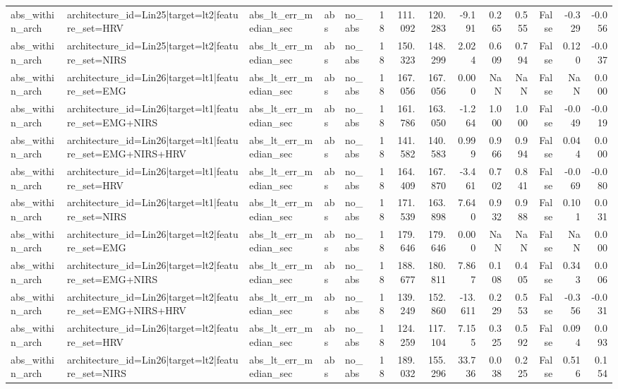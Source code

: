 \begin{table}
\begin{tabular}{lllllrrrrrrrrr}
abs_within_arch & architecture_id=Lin25|target=lt2|feature_set=HRV & abs_lt_err_median_sec & abs & no_abs & 18 & 111.092 & 120.283 & -9.191 & 0.265 & 0.555 & False & -0.329 & -0.056 \\
abs_within_arch & architecture_id=Lin25|target=lt2|feature_set=NIRS & abs_lt_err_median_sec & abs & no_abs & 18 & 150.323 & 148.299 & 2.024 & 0.609 & 0.794 & False & 0.120 & -0.037 \\
abs_within_arch & architecture_id=Lin26|target=lt1|feature_set=EMG & abs_lt_err_median_sec & abs & no_abs & 18 & 167.056 & 167.056 & 0.000 & NaN & NaN & False & NaN & 0.000 \\
abs_within_arch & architecture_id=Lin26|target=lt1|feature_set=EMG+NIRS & abs_lt_err_median_sec & abs & no_abs & 18 & 161.786 & 163.050 & -1.264 & 1.000 & 1.000 & False & -0.049 & -0.019 \\
abs_within_arch & architecture_id=Lin26|target=lt1|feature_set=EMG+NIRS+HRV & abs_lt_err_median_sec & abs & no_abs & 18 & 141.582 & 140.583 & 0.999 & 0.966 & 0.994 & False & 0.044 & 0.000 \\
abs_within_arch & architecture_id=Lin26|target=lt1|feature_set=HRV & abs_lt_err_median_sec & abs & no_abs & 18 & 164.409 & 167.870 & -3.461 & 0.702 & 0.841 & False & -0.069 & -0.080 \\
abs_within_arch & architecture_id=Lin26|target=lt1|feature_set=NIRS & abs_lt_err_median_sec & abs & no_abs & 18 & 171.539 & 163.898 & 7.640 & 0.932 & 0.988 & False & 0.101 & 0.031 \\
abs_within_arch & architecture_id=Lin26|target=lt2|feature_set=EMG & abs_lt_err_median_sec & abs & no_abs & 18 & 179.646 & 179.646 & 0.000 & NaN & NaN & False & NaN & 0.000 \\
abs_within_arch & architecture_id=Lin26|target=lt2|feature_set=EMG+NIRS & abs_lt_err_median_sec & abs & no_abs & 18 & 188.677 & 180.811 & 7.867 & 0.108 & 0.405 & False & 0.343 & 0.006 \\
abs_within_arch & architecture_id=Lin26|target=lt2|feature_set=EMG+NIRS+HRV & abs_lt_err_median_sec & abs & no_abs & 18 & 139.249 & 152.860 & -13.611 & 0.229 & 0.553 & False & -0.356 & -0.031 \\
abs_within_arch & architecture_id=Lin26|target=lt2|feature_set=HRV & abs_lt_err_median_sec & abs & no_abs & 18 & 124.259 & 117.104 & 7.155 & 0.325 & 0.592 & False & 0.094 & 0.093 \\
abs_within_arch & architecture_id=Lin26|target=lt2|feature_set=NIRS & abs_lt_err_median_sec & abs & no_abs & 18 & 189.032 & 155.296 & 33.736 & 0.038 & 0.225 & False & 0.516 & 0.154 \\

\end{tabular}
\end{table}
